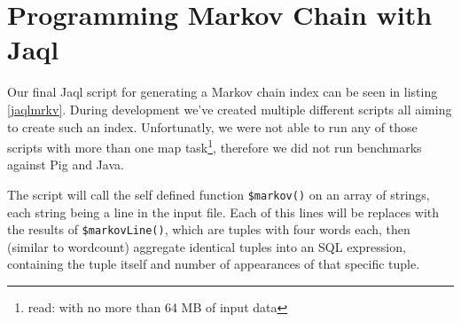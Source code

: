 \section{Programming Markov Chain with Jaql}             



Our final Jaql script for generating a Markov chain index can be seen in listing \ref{jaqlmrkv}. During development we've created multiple different scripts all aiming to create such an index. Unfortunatly, we were not able to run any of those scripts with more than one map task\footnote{read: with no more than 64 MB of input data}, therefore we did not run benchmarks against Pig and Java.

The script will call the self defined function \lstinline[language=jaql]!$markov()! on an array of strings, each string being a line in the input file. Each of this lines will be replaces with the results of \lstinline[language=jaql]!$markovLine()!, which are tuples with four words each, then (similar to wordcount) aggregate identical tuples into an SQL expression, containing the tuple itself and number of appearances of that specific tuple.